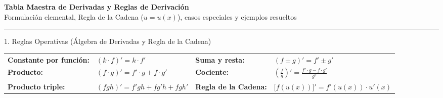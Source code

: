 \documentclass[10pt,a4paper]{article}
\begin{document}
\begin{center}
  {\LARGE \textbf{\color{mainblue} Tabla Maestra de Derivadas y Reglas de Derivación}}\\[1.5mm]
  {\small \color{slatetext} Formulación elemental, Regla de la Cadena ($u = u(x)$), casos especiales y ejemplos resueltos}
\end{center}
\vspace{1mm}
\hrule
\vspace{3mm}

\begin{formulabox}{1. Reglas Operativas (Álgebra de Derivadas y Regla de la Cadena)}
\small
\renewcommand{\arraystretch}{1.28}
\begin{tabularx}{\linewidth}{@{}l X l X@{}}
\textbf{Constante por función:} & $(k\cdot f)' = k\cdot f'$ & \textbf{Suma y resta:} & $(f \pm g)' = f' \pm g'$ \\
\textbf{Producto:} & $(f \cdot g)' = f'\cdot g + f\cdot g'$ & \textbf{Cociente:} & $\displaystyle \left(\frac{f}{g}\right)' = \frac{f'\cdot g - f\cdot g'}{g^2}$ \\
\textbf{Producto triple:} & $(fgh)' = f'gh + fg'h + fgh'$ & \textbf{Regla de la Cadena:} & $\big[f(u(x))\big]' = f'(u(x))\cdot u'(x)$ \\
\end{tabularx}
\end{formulabox}
\end{document}

